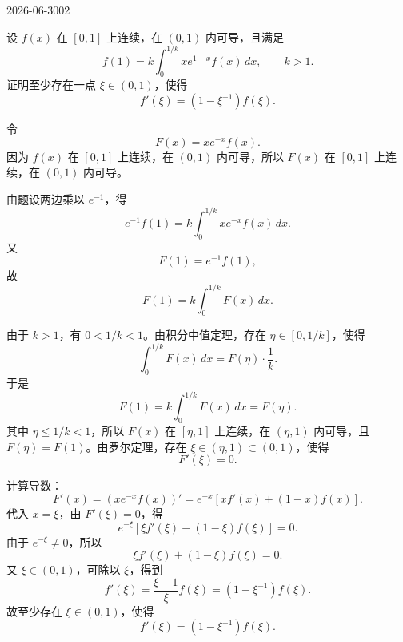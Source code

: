 \begin{mistake}{2026-06-30}{02}

\begin{problemcontent}
设 \(f(x)\) 在 \([0,1]\) 上连续，在 \((0,1)\) 内可导，且满足
\[
f(1)=k\int_0^{1/k}xe^{1-x}f(x)\,dx,\qquad k>1.
\]
证明至少存在一点 \(\xi\in(0,1)\)，使得
\[
f'(\xi)=\left(1-\xi^{-1}\right)f(\xi).
\]
\end{problemcontent}

\begin{solutioncontent}
令
\[
F(x)=xe^{-x}f(x).
\]
因为 \(f(x)\) 在 \([0,1]\) 上连续，在 \((0,1)\) 内可导，所以 \(F(x)\) 在 \([0,1]\) 上连续，在 \((0,1)\) 内可导。

由题设两边乘以 \(e^{-1}\)，得
\[
e^{-1}f(1)=k\int_0^{1/k}xe^{-x}f(x)\,dx.
\]
又
\[
F(1)=e^{-1}f(1),
\]
故
\[
F(1)=k\int_0^{1/k}F(x)\,dx.
\]

由于 \(k>1\)，有 \(0<1/k<1\)。由积分中值定理，存在 \(\eta\in[0,1/k]\)，使得
\[
\int_0^{1/k}F(x)\,dx=F(\eta)\cdot \frac1k.
\]
于是
\[
F(1)=k\int_0^{1/k}F(x)\,dx=F(\eta).
\]
其中 \(\eta\le 1/k<1\)，所以 \(F(x)\) 在 \([\eta,1]\) 上连续，在 \((\eta,1)\) 内可导，且 \(F(\eta)=F(1)\)。由罗尔定理，存在 \(\xi\in(\eta,1)\subset(0,1)\)，使得
\[
F'(\xi)=0.
\]

计算导数：
\[
F'(x)=\left(xe^{-x}f(x)\right)'=e^{-x}\left[xf'(x)+(1-x)f(x)\right].
\]
代入 \(x=\xi\)，由 \(F'(\xi)=0\)，得
\[
e^{-\xi}\left[\xi f'(\xi)+(1-\xi)f(\xi)\right]=0.
\]
由于 \(e^{-\xi}\ne0\)，所以
\[
\xi f'(\xi)+(1-\xi)f(\xi)=0.
\]
又 \(\xi\in(0,1)\)，可除以 \(\xi\)，得到
\[
f'(\xi)=\frac{\xi-1}{\xi}f(\xi)=\left(1-\xi^{-1}\right)f(\xi).
\]
故至少存在 \(\xi\in(0,1)\)，使得
\[
f'(\xi)=\left(1-\xi^{-1}\right)f(\xi).
\]
\end{solutioncontent}


\end{mistake}
